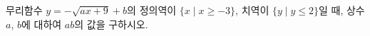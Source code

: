무리함수 $y=-\sqrt{ax+9}+b$의 정의역이 $\{x \mid x\ge -3\}$, 치역이 $\{y \mid y\le 2\}$일 때, 상수 $a$, $b$에 대하여 $ab$의 값을 구하시오.
